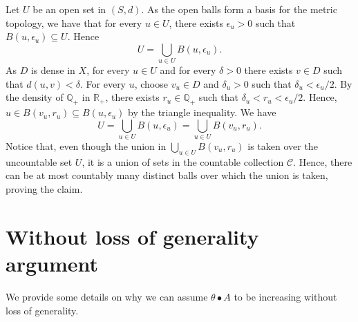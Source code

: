 \documentclass[11pt,a4paper,twoside,openany]{report}
\numberwithin{equation}{section}
\theoremstyle{plain} %
\theoremstyle{definition} %
\theoremstyle{remark} %
\begin{document}
Let \(U\) be an open set in \((S,d)\). As the open balls form a basis for the metric topology, we have that for every \(u\in U\), there exists \(\epsilon_u>0\) such that \(B(u,\epsilon_u)\subseteq U\). Hence
\begin{equation*}
    U=\bigcup_{u\in U}B(u,\epsilon_u).
\end{equation*}
As \(D\) is dense in \(X\), for every \(u\in U\) and for every \(\delta>0\) there exists \(v\in D\) such that \(d(u,v)<\delta\). For every \(u\), choose \(v_u\in D\) and \(\delta_u>0\) such that \(\delta_u<\epsilon_u/2\). By the density of \(\mathbb{Q}_+\) in \(\mathbb{R}_+\), there exists \(r_u\in\mathbb{Q}_+\) such that \(\delta_u<r_u<\epsilon_u/2\). Hence, \(u\in B(v_u,r_u)\subseteq B(u,\epsilon_u)\) by the triangle inequality. We have 
\begin{equation*}
   U=\bigcup_{u\in U}B(u,\epsilon_u)= \bigcup_{u\in U}B(v_u,r_u).
\end{equation*}
Notice that, even though the union in \(\bigcup_{u\in U}B(v_u,r_u)\) is taken over the uncountable set \(U\), it is a union of sets in the countable collection \(\mathcal{C}\). Hence, there can be at most countably many distinct balls over which the union is taken, proving the claim.


\section{Without loss of generality argument }\label{Appendix:w.l.o.g.}
We provide some details on why we can assume \(\theta\bullet A\) to be increasing without loss of generality. 
\end{document}
